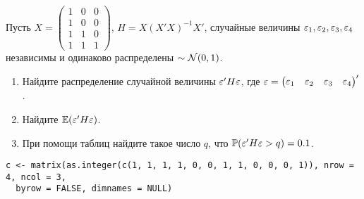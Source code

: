 \begin{problem}
Пусть $X = \begin{pmatrix} 1 & 0 & 0 \\ 1 & 0 & 0 \\ 1 & 1 & 0  \\ 1 & 1 & 1 \end{pmatrix} $, $H = X(X'X)^{-1}X'$, случайные величины $\varepsilon_1, \varepsilon_2, \varepsilon_3, \varepsilon_4$ независимы и одинаково распределены $\sim \mathcal{N}(0,1)$.
\begin{enumerate}
\item Найдите распределение случайной величины $\varepsilon'H\varepsilon$, где $\varepsilon = \begin{pmatrix} \varepsilon_1 & \varepsilon_2 & \varepsilon_3 & \varepsilon_4 \end{pmatrix}'$.
\item Найдите $\mathbb{E}(\varepsilon'H\varepsilon)$.
\item При помощи таблиц найдите такое число $q$, что $\mathbb{P}(\varepsilon'H\varepsilon > q)=0.1$.
\end{enumerate}


\begin{sol}
\begin{verbatim}
c <- matrix(as.integer(c(1, 1, 1, 1, 0, 0, 1, 1, 0, 0, 0, 1)), nrow = 4, ncol = 3,
  byrow = FALSE, dimnames = NULL)
\end{verbatim}
\end{sol}
\end{problem}




